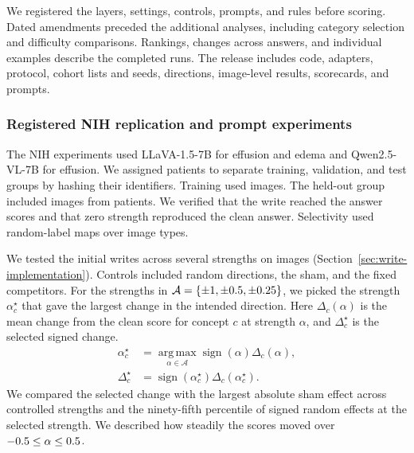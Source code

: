 We registered the layers, settings, controls, prompts, and rules before scoring. Dated amendments preceded the additional analyses, including category selection and difficulty comparisons. Rankings, changes across answers, and individual examples describe the completed runs. The release includes code, adapters, protocol, cohort lists and seeds, directions, image-level results, scorecards, and prompts.

\subsubsection{Registered NIH replication and prompt experiments}
\label{app:seed}

The NIH experiments used LLaVA-1.5-7B for effusion and edema and Qwen2.5-VL-7B for effusion.\cite{liu2024improved,bai2025qwen25vl} We assigned patients to separate training, validation, and test groups by hashing their identifiers. Training used \jnReplicationTrainingRows{} images. The held-out group included \jnReplicationTestRows{} images from \jnReplicationTestPatients{} patients. We verified that the write reached the answer scores and that zero strength reproduced the clean answer. Selectivity used \jnLabelControlCount{} random-label maps over \jnReplicationLabelTypes{} image types.

We tested the initial writes across several strengths on \jnReplicationInitialRows{} images (Section~\ref{sec:write-implementation}). Controls included \jnLabelControlCount{} random directions, the sham, and the fixed competitors. For the strengths in $\mathcal A=\{\pm1,\pm0.5,\pm0.25\}$, we picked the strength $\alpha_c^\star$ that gave the largest change in the intended direction. Here $\Delta_c(\alpha)$ is the mean change from the clean score for concept $c$ at strength $\alpha$, and $\Delta_c^\star$ is the selected signed change.
\begin{equation}
\begin{aligned}
\alpha_c^\star &=
  \operatorname*{arg\,max}_{\alpha\in\mathcal A}
  \operatorname{sign}(\alpha)\Delta_c(\alpha),\\
\Delta_c^\star &=\operatorname{sign}(\alpha_c^\star)
                 \Delta_c(\alpha_c^\star).
\end{aligned}
\label{eq:seed-rule}
\end{equation}
We compared the selected change with the largest absolute sham effect across controlled strengths and the ninety-fifth percentile of signed random effects at the selected strength. We described how steadily the scores moved over $-0.5\le\alpha\le 0.5$.

